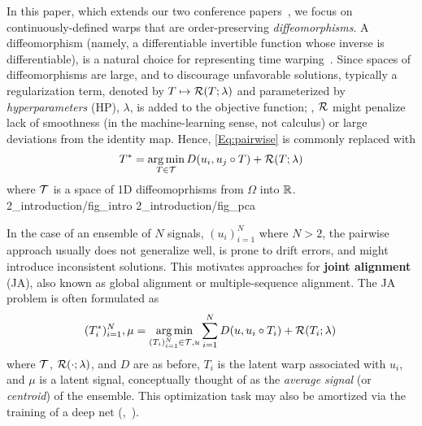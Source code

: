  
  In this paper, which extends our two conference papers~\cite{Shapira:NIPS:2019:DTAN, Shapira:ICML:2023:RFDTAN}, we focus on continuously-defined warps that are 
 order-preserving \emph{diffeomorphisms}. 
A diffeomorphism (namely, a differentiable invertible function whose inverse is differentiable),
 is a natural choice for representing time warping~\cite{Mumford:Book:2010:PT}. 
Since spaces of diffeomorphisms are large, and to discourage unfavorable solutions, typically a regularization 
term, denoted by $T\mapsto\mathcal{R}(T;\lambda)$ and parameterized by \emph{hyperparameters} (HP), $\lambda$, is added to the objective function; \eg, $\mathcal{R}$ might penalize lack of smoothness (in the machine-learning sense, not calculus) or large deviations from the identity map.
Hence, \autoref{Eq:pairwise} is commonly replaced with 
  \begin{align}
     T^* = \operatorname*{arg\,min}_{T\in\mathcal{T}}D(u_i, u_j\circ T)+\mathcal{R}(T;\lambda)
 \end{align}\label{Eq:pairwiseWithReg}
 where $\mathcal{T}$ is a space of 1D diffeomoprhisms from $\Omega$ into $\mathbb{R}$. 
{2_introduction/fig_intro}
{2_introduction/fig_pca}

In the case of an ensemble of $N$ signals, $(u_i)_{i=1}^N$ where $N>2$, the pairwise approach usually does not generalize well,
is prone to drift errors, and might introduce inconsistent solutions. 
This motivates approaches for \textbf{joint alignment} (JA),
also known as global alignment or multiple-sequence alignment.
The JA problem is often formulated as
\begin{align}\label{eq:JA}
    (T_i^*)_{i=1}^N,\mu   = \operatorname*{arg\,min}_{(T_i)_{i=1}^N\in\mathcal{T}, u } \sum\limits_{i=1}^N 
     D(u , u_i\circ T_i)+ \mathcal{R}(T_i;\lambda) \,    
\end{align}
where $\mathcal{T}$, $\mathcal{R}(\cdot;\lambda)$, and $D$ are as before, 
 $T_i$ is the latent warp associated with $u_i$, and $\mu $ is a latent signal, conceptually thought of as the \emph{average signal} (or \emph{centroid}) of the ensemble. This optimization task may also be amortized
via the training of a deep net (\eg,~\cite{Shapira:NIPS:2019:DTAN,huang:2021:residual,Martinez:ICML:2022:closed,Shapira:ICML:2023:RFDTAN}).

